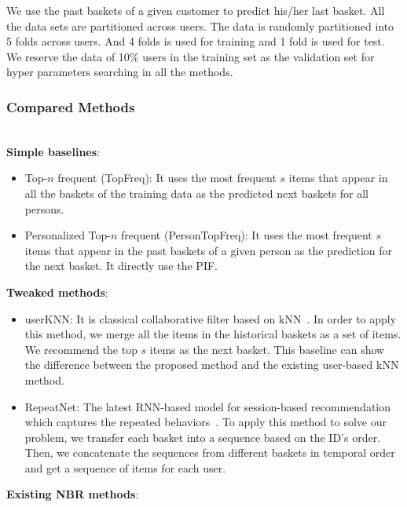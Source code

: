 \documentclass[sigconf]{acmart}
\begin{document}
We use the  past baskets of a given customer to  predict his/her last basket. All the data sets are partitioned across users.  The data is randomly  partitioned into 5 folds across users. And 4 folds is used for training and 1 fold is used for test. We reserve the data of 10\% users in the training set as the validation set for hyper parameters searching in all the methods.  



\subsubsection{Compared  Methods}
\label{sec:baseline}
\ \\
\textbf{Simple baselines}:
\begin{itemize}

\item{Top-$n$ frequent (TopFreq):} It uses the most frequent $s$ items  that appear in all the baskets of  the training data as the predicted  next baskets for  all persons.
\item{Personalized Top-$n$ frequent (PersonTopFreq):} It uses the most frequent $s$ items that appear in the past baskets  of a given person as the prediction for the next basket. It directly use the PIF.
\end{itemize}
\textbf{Tweaked methods}:
\begin{itemize}
\item{userKNN:} It is classical collaborative filter  based on  kNN~\cite{konstan1997grouplens}. In order to apply this method, we merge  all the  items in the  historical baskets as a set of items. We recommend the top $s$ items as the next basket. This baseline can show the difference  between the  proposed method and the existing user-based kNN method.
\item{RepeatNet:} The latest  RNN-based model  for session-based recommendation which captures the repeated behaviors~\cite{ren2019repeatnet}. To apply this method to solve our problem, we transfer each basket into a sequence based on the ID's order. Then, we concatenate the sequences from  different baskets in temporal order and get a  sequence of items for each user.
\end{itemize}
\textbf{Existing NBR methods}:
\end{document}
